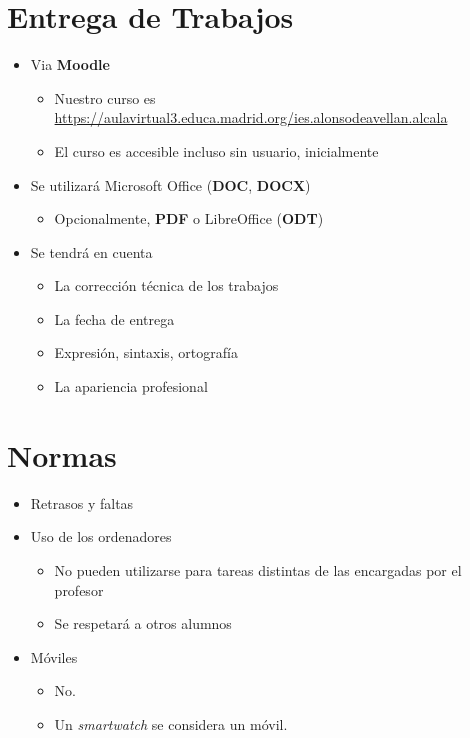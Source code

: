 \documentclass[a4paper]{article}
\begin{document}
\section{Entrega de Trabajos}
\label{sec:org0000009}
\begin{itemize}
\item Via \textbf{Moodle}
\begin{itemize}
\item Nuestro curso es \url{https://aulavirtual3.educa.madrid.org/ies.alonsodeavellan.alcala}
\item El curso es accesible incluso sin usuario, inicialmente
\end{itemize}
\item Se utilizará Microsoft Office (\textbf{DOC}, \textbf{DOCX})
\begin{itemize}
\item Opcionalmente, \textbf{PDF} o LibreOffice (\textbf{ODT})
\end{itemize}
\item Se tendrá en cuenta
\begin{itemize}
\item La corrección técnica de los trabajos
\item La fecha de entrega
\item Expresión, sintaxis, ortografía
\item La apariencia profesional
\end{itemize}
\end{itemize}


\section{Normas}
\label{sec:org000000f}
\begin{itemize}
\item Retrasos y faltas
\item Uso de los ordenadores
\begin{itemize}
\item No pueden utilizarse para tareas distintas de las encargadas por el profesor
\item Se respetará a otros alumnos
\end{itemize}
\item Móviles
\begin{itemize}
\item No.
\item Un \emph{smartwatch} se considera un móvil.
\end{itemize}
\end{itemize}
\end{document}
